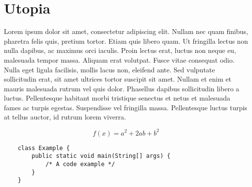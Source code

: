 \documentclass{article}
\begin{document}
\section*{Utopia}
\noindent Lorem ipsum dolor sit amet, consectetur adipiscing elit. Nullam nec
quam finibus, pharetra felis quis, pretium tortor. Etiam quis libero quam. Ut
fringilla lectus non nulla dapibus, ac maximus orci iaculis. Proin lectus erat,
luctus non neque eu, malesuada tempor massa. Aliquam erat volutpat. Fusce vitae
consequat odio. Nulla eget ligula facilisis, mollis lacus non, eleifend ante.
Sed vulputate sollicitudin erat, sit amet ultrices tortor suscipit sit amet.
Nullam et enim et mauris malesuada rutrum vel quis dolor. Phasellus dapibus
sollicitudin libero a luctus. Pellentesque habitant morbi tristique senectus et
netus et malesuada fames ac turpis egestas. Suspendisse vel fringilla massa.
Pellentesque luctus turpis at tellus auctor, id rutrum lorem viverra.

\bigskip

\begin{equation}
    f(x) = a^2 + 2ab + b^2 
\end{equation}

\bigskip

\begin{verbatim}
    class Example {
        public static void main(String[] args) {
            /* A code example */
        }
    }
\end{verbatim}
\end{document}
